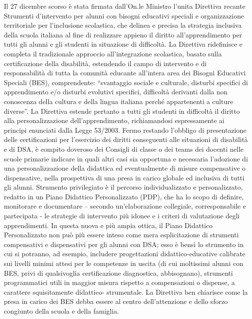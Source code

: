 Il 27 dicembre scorso è stata firmata dall'On.le Ministro l'unita Direttiva recante Strumenti
d'intervento per alunni con bisogni educativi speciali e organizzazione territoriale per l'inclusione
scolastica, che delinea e precisa la strategia inclusiva della scuola italiana al fine di realizzare
appieno il diritto all'apprendimento per tutti gli alunni e gli studenti in situazione di difficoltà. La
Direttiva ridefinisce e completa il tradizionale approccio all'integrazione scolastica, basato sulla
certificazione della disabilità, estendendo il campo di intervento e di responsabilità di tutta la comunità educante all'intera area dei Bisogni Educativi Speciali (BES), comprendente: “svantaggio
sociale e culturale, disturbi specifici di apprendimento e/o disturbi evolutivi specifici, difficoltà
derivanti dalla non conoscenza della cultura e della lingua italiana perché appartenenti a culture
diverse”.
La Direttiva estende pertanto a tutti gli studenti in difficoltà il diritto alla personalizzazione
dell'apprendimento, richiamandosi espressamente ai principi enunciati dalla Legge 53/2003.
Fermo restando l'obbligo di presentazione delle certificazioni per l'esercizio dei diritti
conseguenti alle situazioni di disabilità e di DSA, è compito doveroso dei Consigli di classe o dei
teams dei docenti nelle scuole primarie indicare in quali altri casi sia opportuna e necessaria
l'adozione di una personalizzazione della didattica ed eventualmente di misure compensative o
dispensative, nella prospettiva di una presa in carico globale ed inclusiva di tutti gli alunni.
Strumento privilegiato è il percorso individualizzato e personalizzato, redatto in un Piano
Didattico Personalizzato (PDP), che ha lo scopo di definire, monitorare e documentare – secondo
un'elaborazione collegiale, corresponsabile e partecipata - le strategie di intervento più idonee e i
criteri di valutazione degli apprendimenti.
In questa nuova e più ampia ottica, il Piano Didattico Personalizzato non può più essere inteso
come mera esplicitazione di strumenti compensativi e dispensativi per gli alunni con DSA; esso è
bensì lo strumento in cui si potranno, ad esempio, includere progettazioni didattico-educative
calibrate sui livelli minimi attesi per le competenze in uscita (di cui moltissimi alunni con BES,
privi di qualsivoglia certificazione diagnostica, abbisognano), strumenti programmatici utili in
maggior misura rispetto a compensazioni o dispense, a carattere squisitamente didattico-
strumentale.
La Direttiva ben chiarisce come la presa in carico dei BES debba essere al centro dell'attenzione
e dello sforzo congiunto della scuola e della famiglia.
